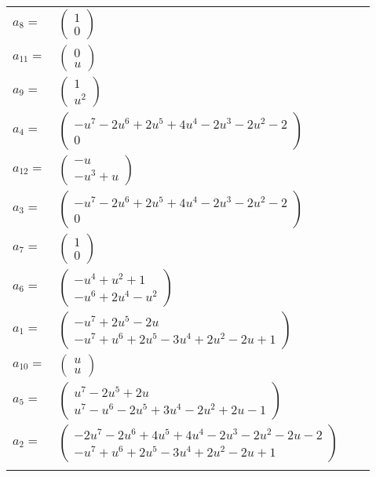 \documentclass[1p]{elsarticle_modified}
\theoremstyle{definition}
\begin{document}
\begin{tabular}{m{7pt} m{180pt} m{7pt} m{180pt} }
\flushright $a_{8}=$&$\begin{pmatrix}1\\0\end{pmatrix}$ \\
\flushright $a_{11}=$&$\begin{pmatrix}0\\u\end{pmatrix}$ \\
\flushright $a_{9}=$&$\begin{pmatrix}1\\u^2\end{pmatrix}$ \\
\flushright $a_{4}=$&$\begin{pmatrix}- u^7-2 u^6+2 u^5+4 u^4-2 u^3-2 u^2-2\\0\end{pmatrix}$ \\
\flushright $a_{12}=$&$\begin{pmatrix}- u\\- u^3+u\end{pmatrix}$ \\
\flushright $a_{3}=$&$\begin{pmatrix}- u^7-2 u^6+2 u^5+4 u^4-2 u^3-2 u^2-2\\0\end{pmatrix}$ \\
\flushright $a_{7}=$&$\begin{pmatrix}1\\0\end{pmatrix}$ \\
\flushright $a_{6}=$&$\begin{pmatrix}- u^4+u^2+1\\- u^6+2 u^4- u^2\end{pmatrix}$ \\
\flushright $a_{1}=$&$\begin{pmatrix}- u^7+2 u^5-2 u\\- u^7+u^6+2 u^5-3 u^4+2 u^2-2 u+1\end{pmatrix}$ \\
\flushright $a_{10}=$&$\begin{pmatrix}u\\u\end{pmatrix}$ \\
\flushright $a_{5}=$&$\begin{pmatrix}u^7-2 u^5+2 u\\u^7- u^6-2 u^5+3 u^4-2 u^2+2 u-1\end{pmatrix}$ \\
\flushright $a_{2}=$&$\begin{pmatrix}-2 u^7-2 u^6+4 u^5+4 u^4-2 u^3-2 u^2-2 u-2\\- u^7+u^6+2 u^5-3 u^4+2 u^2-2 u+1\end{pmatrix}$\\&\end{tabular}
\end{document}
